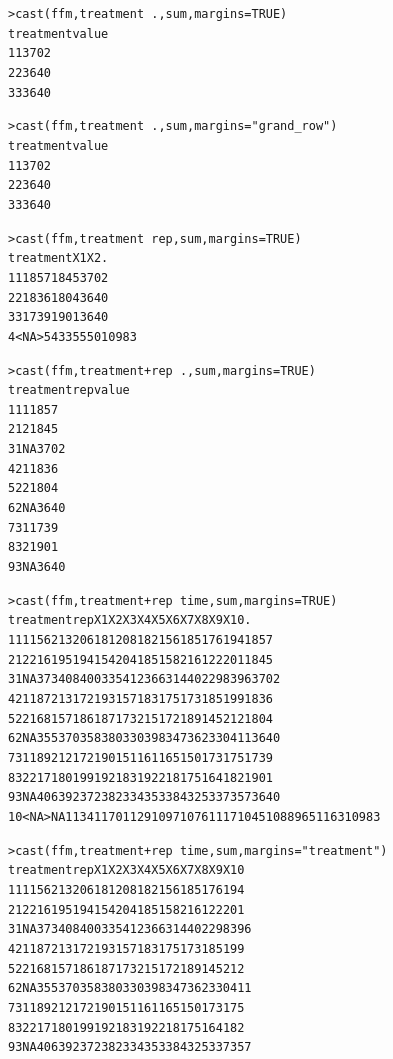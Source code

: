 \documentclass[oneside,letterpaper]{scrartcl}
\begin{document}
\begin{alltt}
> cast(ffm, treatment ~ ., sum, margins = TRUE)
  treatment value
1         1  3702
2         2  3640
3         3  3640

> cast(ffm, treatment ~ ., sum, margins = "grand_row")
  treatment value
1         1  3702
2         2  3640
3         3  3640

> cast(ffm, treatment ~ rep, sum, margins = TRUE)
  treatment   X1   X2     .
1         1 1857 1845  3702
2         2 1836 1804  3640
3         3 1739 1901  3640
4      <NA> 5433 5550 10983

> cast(ffm, treatment + rep ~ ., sum, margins = TRUE)
  treatment rep value
1         1   1  1857
2         1   2  1845
3         1  NA  3702
4         2   1  1836
5         2   2  1804
6         2  NA  3640
7         3   1  1739
8         3   2  1901
9         3  NA  3640

> cast(ffm, treatment + rep ~ time, sum, margins = TRUE)
   treatment rep   X1   X2   X3   X4   X5   X6   X7   X8  X9  X10     .
1          1   1  156  213  206  181  208  182  156  185 176  194  1857
2          1   2  216  195  194  154  204  185  158  216 122  201  1845
3          1  NA  373  408  400  335  412  366  314  402 298  396  3702
4          2   1  187  213  172  193  157  183  175  173 185  199  1836
5          2   2  168  157  186  187  173  215  172  189 145  212  1804
6          2  NA  355  370  358  380  330  398  347  362 330  411  3640
7          3   1  189  212  172  190  151  161  165  150 173  175  1739
8          3   2  217  180  199  192  183  192  218  175 164  182  1901
9          3  NA  406  392  372  382  334  353  384  325 337  357  3640
10      <NA>  NA 1134 1170 1129 1097 1076 1117 1045 1088 965 1163 10983

> cast(ffm, treatment + rep ~ time, sum, margins = "treatment")
  treatment rep  X1  X2  X3  X4  X5  X6  X7  X8  X9 X10
1         1   1 156 213 206 181 208 182 156 185 176 194
2         1   2 216 195 194 154 204 185 158 216 122 201
3         1  NA 373 408 400 335 412 366 314 402 298 396
4         2   1 187 213 172 193 157 183 175 173 185 199
5         2   2 168 157 186 187 173 215 172 189 145 212
6         2  NA 355 370 358 380 330 398 347 362 330 411
7         3   1 189 212 172 190 151 161 165 150 173 175
8         3   2 217 180 199 192 183 192 218 175 164 182
9         3  NA 406 392 372 382 334 353 384 325 337 357


\end{alltt}
\end{document}
